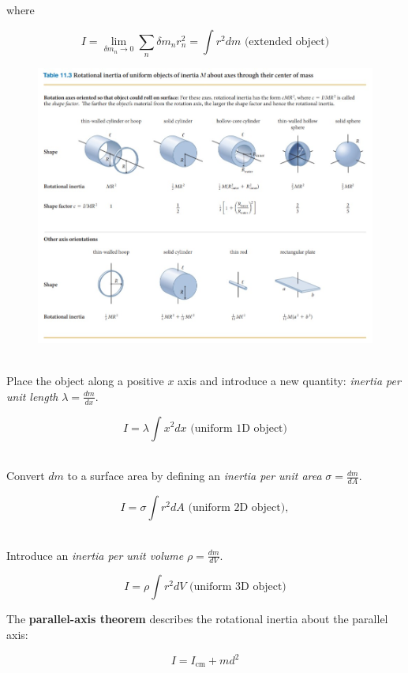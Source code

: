         where

        \[
            I = \lim_{\delta m_n \rightarrow 0} \sum_n \delta m_n r^2_n = \int r^2 dm \text{ (extended object)}
        \]

        \begin{figure}[hbt!]
            \centering
            \includegraphics[scale=0.75]{Resources/rotational_coords2}
        \end{figure}

         \\
        Place the object along a positive $x$ axis and introduce a new quantity: \textit{inertia per unit length} $\lambda = \frac{dm}{dx}$.

        \[
            I = \lambda \int x^2 dx \text{ (uniform 1D object)}
        \]

         \\
        Convert $dm$ to a surface area by defining an \textit{inertia per unit area} $\sigma = \frac{dm}{dA}$.

        \[
            I = \sigma \int r^2 dA \text{ (uniform 2D object)},
        \]

         \\
        Introduce an \textit{inertia per unit volume} $\rho = \frac{dm}{dV}$.

        \[
            I = \rho \int r^2 dV \text{ (uniform 3D object)}
        \]

        The \textbf{parallel-axis theorem} describes the rotational inertia about the parallel axis:

        \[
            I = I_{\text{cm}} + md^2
        \]





